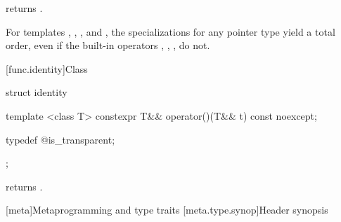 \begin{itemdescr}
\pnum
{} returns .
\end{itemdescr}

\pnum
For templates , , , and
, the specializations for any pointer type yield a total order,
even if the built-in operators \tcode{<}, \tcode{>}, \tcode{<=}, \tcode{>=}
do not.

[func.identity]{Class }

%
\begin{itemdecl}
struct identity {
  template <class T>
  constexpr T&& operator()(T&& t) const noexcept;

  typedef @\unspec@ is_transparent;
};
\end{itemdecl}

\begin{itemdescr}
\pnum
{} returns .

\end{itemdescr}

[meta]{Metaprogramming and type traits}
[meta.type.synop]{Header  synopsis}


